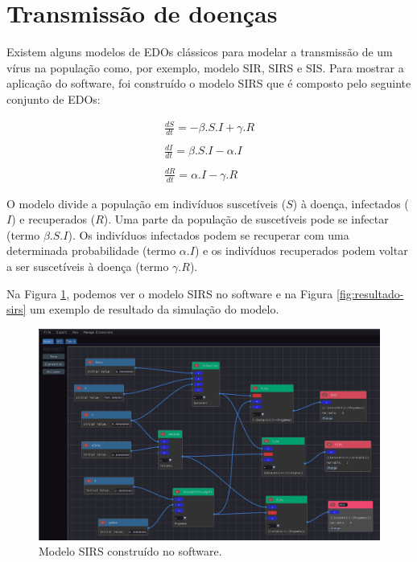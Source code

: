 \documentclass[
	12pt,				%
	openright,			%
	oneside,			%
	a4paper,			%
	main=brazil,
	english,			%
	]{ufsj-abntex2}
\begin{document}
\section{Transmissão de doenças}
Existem alguns modelos de EDOs clássicos para modelar a transmissão de um vírus na população como, por exemplo, modelo SIR, SIRS e SIS. Para mostrar a aplicação do software, foi construído o modelo SIRS que é composto pelo seguinte conjunto de EDOs: 

\begin{equation}\label{eq:sirs}
    \begin{array}{lr}
    \frac{dS}{dt} = -\beta.S.I + \gamma.R
    \\
    \\
    \frac{dI}{dt} = \beta.S.I - \alpha.I
    \\
    \\ 
    \frac{dR}{dt} = \alpha.I - \gamma.R
    \end{array}
\end{equation}

O modelo divide a população em indivíduos suscetíveis ($S$) à doença, infectados ($I$) e recuperados ($R$). Uma parte da população de suscetíveis pode se infectar (termo $\beta.S.I$). Os indivíduos infectados podem se recuperar com uma determinada probabilidade (termo $\alpha.I$) e os indivíduos recuperados podem voltar a ser suscetíveis à doença (termo $\gamma.R$).  

Na Figura \ref{fig:sirs}, podemos ver o modelo SIRS no software e na Figura \ref{fig:resultado-sirs} um exemplo de resultado da simulação do modelo. 

\begin{figure}[h]
    \centering
    \includegraphics[width=\textwidth]{imgs/modelos/sirs.png} 
    \caption{Modelo SIRS construído no software.}
    \label{fig:sirs}
\end{figure}
\end{document}
